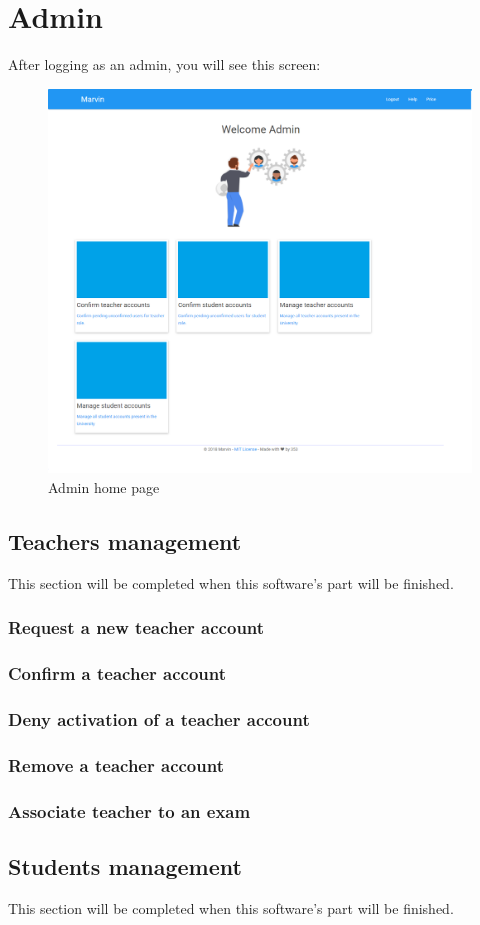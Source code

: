 \documentclass[ManualeUtente]{subfiles}
\begin{document}
\chapter{Admin}
After logging as an admin, you will see this screen:
\begin{figure}[H]
	\centering
	\includegraphics[width=0.7\linewidth]{image/Admin}
	\caption[Admin home page]{Admin home page}
	\label{fig:universityaddamin}
\end{figure}
\section{Teachers management}
This section will be completed when this software's part will be finished.
\subsection{Request a new teacher account}
\subsection{Confirm a teacher account}
\subsection{Deny activation of a teacher account}
\subsection{Remove a teacher account}
\subsection{Associate teacher to an exam}

\section{Students management}
This section will be completed when this software's part will be finished.
\end{document}
